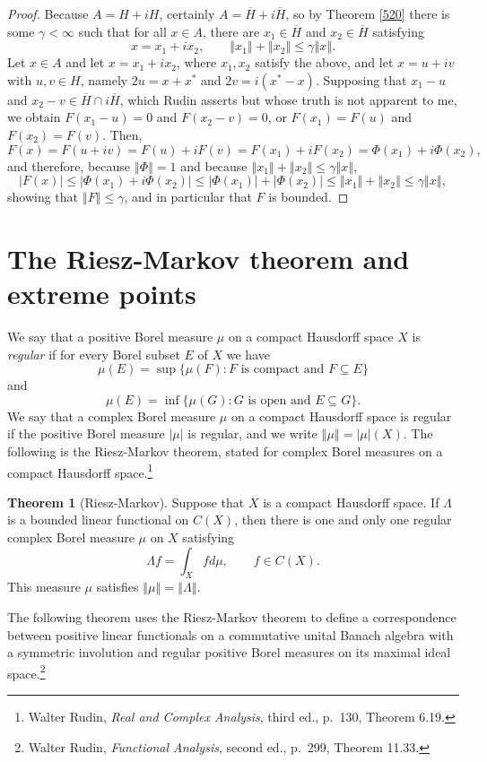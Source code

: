 \documentclass{article}
\newcommand{\norm}[1]{\left\Vert #1 \right\Vert}
\theoremstyle{definition}
\newtheorem{theorem}{Theorem}
\theoremstyle{definition}
\begin{document}
\begin{proof}
Because $A=H+iH$, certainly $A=\overline{H}+i\overline{H}$, so by Theorem \ref{520} there is some $\gamma<\infty$ such
that for all $x \in A$, there are $x_1 \in \overline{H}$ and $x_2 \in \overline{H}$  satisfying
\[
x=x_1+ ix_2, \qquad \norm{x_1}+\norm{x_2} \leq \gamma \norm{x}.
\]
Let $x \in A$ and let $x=x_1+ix_2$, where $x_1,x_2$ satisfy the above, and let
$x=u+iv$ with $u,v \in H$, namely  $2u=x+x^*$ and $2v=i(x^*-x)$.
Supposing that $x_1-u$ and $x_2-v \in \overline{H} \cap i\overline{H}$, which Rudin asserts but whose truth is not apparent to me,
we obtain $F(x_1-u)=0$ and $F(x_2-v)=0$, or $F(x_1)=F(u)$ and $F(x_2)=F(v)$.
Then,
\[
F(x)=F(u+iv)=F(u)+iF(v) = F(x_1)+iF(x_2) = \Phi(x_1)+i\Phi(x_2),
\]
and therefore, because $\norm{\Phi}=1$ and because $\norm{x_1}+\norm{x_2} \leq \gamma\norm{x}$,
\[
|F(x)| \leq |\Phi(x_1)+i\Phi(x_2)| \leq |\Phi(x_1)|+|\Phi(x_2)| \leq \norm{x_1}+\norm{x_2}  \leq \gamma \norm{x},
\]
showing that $\norm{F} \leq \gamma$, and in particular that $F$ is bounded.
\end{proof}




\section{The Riesz-Markov theorem and extreme points}
We say that a positive Borel measure $\mu$ on a compact Hausdorff space $X$ is {\em regular} if
for every Borel subset $E$ of $X$ we have
\[
\mu(E) = \sup \{\mu(F): \textrm{$F$ is compact and $F \subseteq E$}\}
\]
and
\[
\mu(E) = \inf\{ \mu(G): \textrm{$G$ is open and $E \subseteq G$}\}.
\]
We say that a complex Borel measure $\mu$ on a compact Hausdorff space is regular if the positive Borel measure
$|\mu|$ is regular, and we write $\norm{\mu}=|\mu|(X)$.
The following is the Riesz-Markov theorem, stated for complex Borel measures on a compact Hausdorff space.\footnote{Walter Rudin, {\em Real and Complex
Analysis}, third ed., p.~130, Theorem 6.19.}

\begin{theorem}[Riesz-Markov]
Suppose that $X$ is a compact Hausdorff space. If $\Lambda$ is a bounded linear functional on $C(X)$, then there is one and only one regular complex Borel measure
$\mu$ on $X$ satisfying
\[
\Lambda f = \int_X f d\mu, \qquad f \in C(X).
\]
This measure $\mu$ satisfies $\norm{\mu}=\norm{\Lambda}$.
\label{riesz}
\end{theorem}

The following theorem uses the Riesz-Markov theorem to define a correspondence
between positive linear functionals on a commutative unital Banach algebra with a symmetric involution
and regular positive  Borel measures on its maximal ideal space.\footnote{Walter Rudin, {\em Functional Analysis}, second ed., p.~299, Theorem 11.33.}
\end{document}
